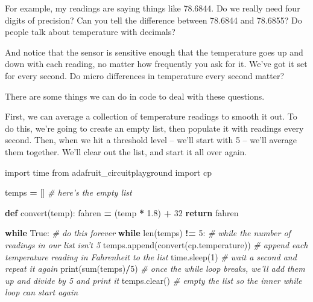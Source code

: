 \documentclass[
]{book}
\newenvironment{Shaded}{\begin{snugshade}}{\end{snugshade}}
\newcommand{\BuiltInTok}[1]{#1}
\newcommand{\CommentTok}[1]{\textcolor[rgb]{0.56,0.35,0.01}{\textit{#1}}}
\newcommand{\ControlFlowTok}[1]{\textcolor[rgb]{0.13,0.29,0.53}{\textbf{#1}}}
\newcommand{\DecValTok}[1]{\textcolor[rgb]{0.00,0.00,0.81}{#1}}
\newcommand{\FloatTok}[1]{\textcolor[rgb]{0.00,0.00,0.81}{#1}}
\newcommand{\ImportTok}[1]{#1}
\newcommand{\KeywordTok}[1]{\textcolor[rgb]{0.13,0.29,0.53}{\textbf{#1}}}
\newcommand{\NormalTok}[1]{#1}
\newcommand{\OperatorTok}[1]{\textcolor[rgb]{0.81,0.36,0.00}{\textbf{#1}}}
\newcommand{\VariableTok}[1]{\textcolor[rgb]{0.00,0.00,0.00}{#1}}
\begin{document}
For example, my readings are saying things like 78.6844. Do we really need four digits of precision? Can you tell the difference between 78.6844 and 78.6855? Do people talk about temperature with decimals?

And notice that the sensor is sensitive enough that the temperature goes up and down with each reading, no matter how frequently you ask for it. We've got it set for every second. Do micro differences in temperature every second matter?

There are some things we can do in code to deal with these questions.

First, we can average a collection of temperature readings to smooth it out. To do this, we're going to create an empty list, then populate it with readings every second. Then, when we hit a threshold level -- we'll start with 5 -- we'll average them together. We'll clear out the list, and start it all over again.

\begin{Shaded}
\begin{Highlighting}[]
\ImportTok{import}\NormalTok{ time}
\ImportTok{from}\NormalTok{ adafruit_circuitplayground }\ImportTok{import}\NormalTok{ cp}

\NormalTok{temps }\OperatorTok{=}\NormalTok{ [] }\CommentTok{# here's the empty list}

\KeywordTok{def}\NormalTok{ convert(temp):}
\NormalTok{    fahren }\OperatorTok{=}\NormalTok{ (temp }\OperatorTok{*} \FloatTok{1.8}\NormalTok{) }\OperatorTok{+} \DecValTok{32} 
    \ControlFlowTok{return}\NormalTok{ fahren }

\ControlFlowTok{while} \VariableTok{True}\NormalTok{: }\CommentTok{# do this forever}
    \ControlFlowTok{while} \BuiltInTok{len}\NormalTok{(temps) }\OperatorTok{!=} \DecValTok{5}\NormalTok{: }\CommentTok{# while the number of readings in our list isn't 5 }
\NormalTok{        temps.append(convert(cp.temperature)) }\CommentTok{# append each temperature reading in Fahrenheit to the list}
\NormalTok{        time.sleep(}\DecValTok{1}\NormalTok{) }\CommentTok{# wait a second and repeat it again}
    \BuiltInTok{print}\NormalTok{(}\BuiltInTok{sum}\NormalTok{(temps)}\OperatorTok{/}\DecValTok{5}\NormalTok{) }\CommentTok{# once the while loop breaks, we'll add them up and divide by 5 and print it}
\NormalTok{    temps.clear() }\CommentTok{# empty the list so the inner while loop can start again}
\end{Highlighting}
\end{Shaded}
\end{document}
